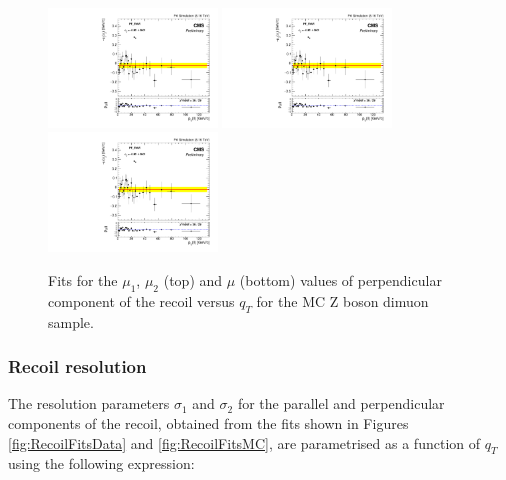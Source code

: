 \begin{figure}
\begin{center}
\includegraphics[width=0.4\textwidth]{Figures/WBoson/Analysis/Correction/Recoil/RecoilFitsqT/MC/fitPFu2mean1.pdf}
\includegraphics[width=0.4\textwidth]{Figures/WBoson/Analysis/Correction/Recoil/RecoilFitsqT/MC/fitPFu2mean2.pdf} \\
\includegraphics[width=0.4\textwidth]{Figures/WBoson/Analysis/Correction/Recoil/RecoilFitsqT/MC/fitPFu2mean.pdf}
\caption{Fits for the $\mu_{1}$,  $\mu_{2}$ (top) and $\mu$ (bottom) values of perpendicular component of the recoil versus $q_{T}$ for the MC Z boson dimuon sample.}
\label{fig:figU2RecoilScaleFit_MC}
\end{center}
\end{figure}

\clearpage

\subsubsection{Recoil resolution}\label{sec:WBoson_Analysis_Rres}

The resolution parameters $\sigma_{1}$ and  $\sigma_{2}$ for the parallel and perpendicular components of the recoil, obtained from the fits shown in Figures \ref{fig:RecoilFitsData} and \ref{fig:RecoilFitsMC}, are parametrised as a function of $q_{T}$ using the following expression:

